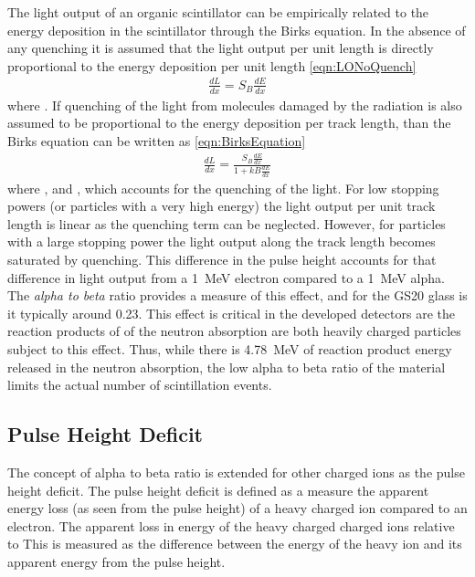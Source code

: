 The light output of an organic scintillator can be empirically related to the energy deposition in the scintillator through the Birks equation.
In the absence of any quenching it is assumed that the light output per unit length is directly proportional to the energy deposition per unit length \eqref{eqn:LONoQuench}
\begin{align}
  \label{eqn:LONoQuench}
    \frac{dL}{dx} = S_B\frac{dE}{dx}
\end{align}
where .
If quenching of the light from molecules damaged by the radiation is also assumed to be proportional to the energy deposition per track length, than the Birks equation can be written as \eqref{eqn:BirksEquation}
\begin{align}
  \label{eqn:BirksEquation}
    \frac{dL}{dx} = \frac{S_B\frac{dE}{dx}}{1+kB\frac{dE}{dx}}
    \end{align}
    where , and , which accounts for the quenching of the light.
For low stopping powers (or particles with a very high energy) the light output per unit track length is linear as the quenching term can be neglected.
However, for particles with a large stopping power the light output along the track length becomes saturated by quenching.
This difference in the pulse height accounts for that difference in light output from a \SI{1}{\MeV} electron compared to a \SI{1}{\MeV} alpha.
The \textit{alpha to beta} ratio provides a measure of this effect, and for the GS20 glass is it typically around 0.23.
This effect is critical in the developed detectors are the reaction products of of the  neutron absorption are both heavily charged particles subject to this effect.
Thus, while there is \SI{4.78}{\MeV} of reaction product energy released in the neutron absorption, the low alpha to beta ratio of the material limits the actual number of scintillation events.

\subsection{Pulse Height Deficit}
The concept of alpha to beta ratio is extended for other charged ions as the pulse height deficit.
The pulse height deficit is defined as a measure the apparent energy loss (as seen from the pulse height) of a heavy charged ion compared to an electron.  
The apparent loss in energy of the heavy charged charged ions relative to
This is measured as the difference between the energy of the heavy ion and its apparent energy from the pulse height.  

